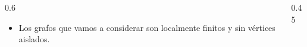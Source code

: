 \begin{frame}{}
   \vspace*{0.68cm}%
    \vfill
    \vfill
\end{frame}


\begin{frame}[c]
   \vspace{0.56cm}
   \begin{columns}[c,totalwidth=1.05\textwidth]
      \begin{column}{0.6\textwidth}
         \hspace*{-0.24cm}%
         \begin{minipage}{\linewidth}
            \begin{itemize}
               \item Los grafos que vamos a considerar son \alert{localmente finitos} y \alert{sin vértices aislados}.
            \end{itemize}
         \end{minipage}
      \end{column}
      \begin{column}{0.45\textwidth}
         \hspace*{-0.24cm}%
         \begin{minipage}{\linewidth}
            \centering\small
            \setlength{\leftmargini}{1.2em}
            \vspace{0.3cm}
         \end{minipage}
      \end{column}
   \end{columns}
\end{frame}
